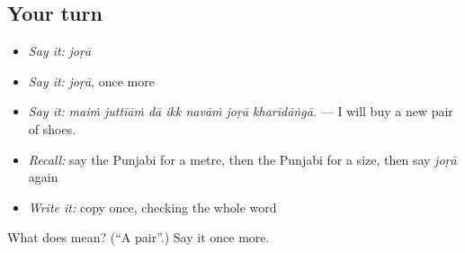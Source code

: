 \subsection*{Your turn}
\begin{itemize}
\raggedright
  \item \emph{Say it:} \emph{joṛā}
  \item \emph{Say it:} \emph{joṛā}, once more
  \item \emph{Say it:} \emph{maiṁ juttīāṁ dā ikk navāṁ joṛā kharīdāṅgā.} — I will buy a new pair of shoes.
  \item \emph{Recall:} say the Punjabi for a metre, then the Punjabi for a size, then say \emph{joṛā} again
  \item \emph{Write it:} copy \textbf{} once, checking the whole word
\end{itemize}

\begin{tcolorbox}[breakable,colback=teal!4,colframe=teal!35!black,title={Before you move on}]
What does  mean? (\textquotedblleft{}A pair\textquotedblright{}.) Say it once more.
\end{tcolorbox}
